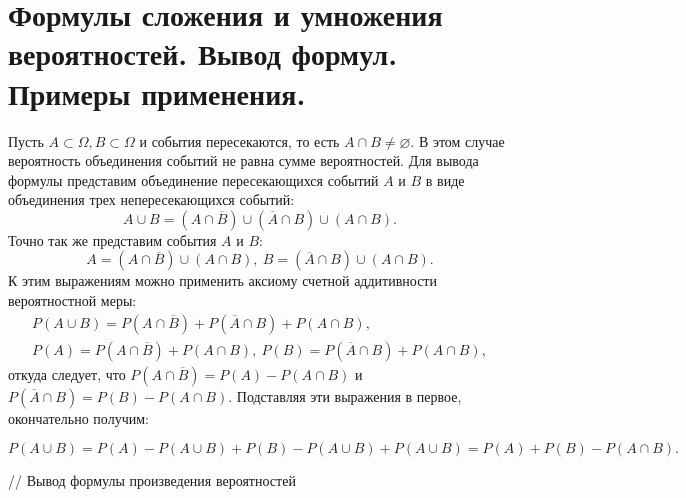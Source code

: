 \documentclass[polytech/stats/exam-2023/stats-exam-2023.tex]{subfiles}
\begin{document}
\section{Формулы сложения и умножения вероятностей. Вывод формул. Примеры применения.}
    Пусть $A \subset \Omega, B \subset \Omega$ и события пересекаются, то есть $A \cap B \neq \varnothing$.
    В этом случае вероятность объединения событий не равна сумме вероятностей. Для вывода формулы представим
    объединение пересекающихся событий $A$ и $B$ в виде объединения трех непересекающихся событий:
    \begin{equation*}
        A \cup B = (A \cap \overline{B}) \cup (\overline{A} \cap B) \cup (A \cap B).
    \end{equation*}
    Точно так же представим события $A$ и $B$:
    \begin{equation*}
        A = (A \cap \overline{B}) \cup (A \cap B), \ B = (\overline{A} \cap B) \cup (A \cap B).
    \end{equation*}
    К этим выражениям можно применить аксиому счетной аддитивности вероятностной меры:
    \begin{gather*}
        P(A \cup B) = P(A \cap \overline{B}) + P(\overline{A} \cap B) + P(A \cap B),\\
        P(A) = P(A \cap \overline{B}) + P(A \cap B), \ P(B) = P(\overline{A} \cap B) + P(A \cap B),
    \end{gather*}
    откуда следует, что $P(A \cap \overline{B}) = P(A) - P(A \cap B)$ и $P(\overline{A} \cap B) = P(B) - P(A \cap B)$.
    Подставляя эти выражения в первое, окончательно получим:
    \begin{theorem}
        \begin{equation*}
            P(A \cup B) = P(A) - P(A \cup B) + P(B) - P(A \cup B) + P(A \cup B) = P(A) + P(B) - P(A \cap B).
        \end{equation*}
    \end{theorem}

    // Вывод формулы произведения вероятностей

    \newpage
\end{document}
